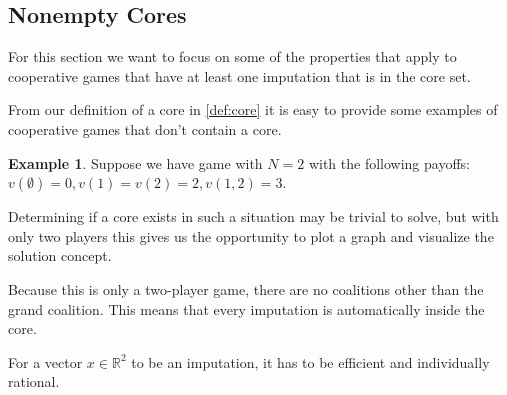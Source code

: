 \documentclass[10pt,a4paper,titlepage]{article}
\theoremstyle{plain}
\theoremstyle{definition}
\newtheorem{exmp}[thm]{Example} %
\begin{document}
 \subsection{Nonempty Cores}
 For this section we want to focus on some of the properties that apply to cooperative games that have at least one imputation that is in the core set.

 From our definition of a core in \ref{def:core} it is easy to provide some examples of cooperative games that don't contain a core.

 \begin{exmp}
    Suppose we have game with $N = 2$ with the following payoffs: $v(\emptyset) = 0, v(1) = v(2) = 2, v(1, 2) = 3$.

    Determining if a core exists in such a situation may be trivial to solve, but with only two players this gives us the opportunity to plot a graph and visualize the solution concept.
    
    Because this is only a two-player game, there are no coalitions other than the grand coalition. This means that every imputation is automatically inside the core.

    For a vector $x \in \mathbb{R}^2$ to be an imputation, it has to be efficient and individually rational.

 \end{exmp}
\end{document}
